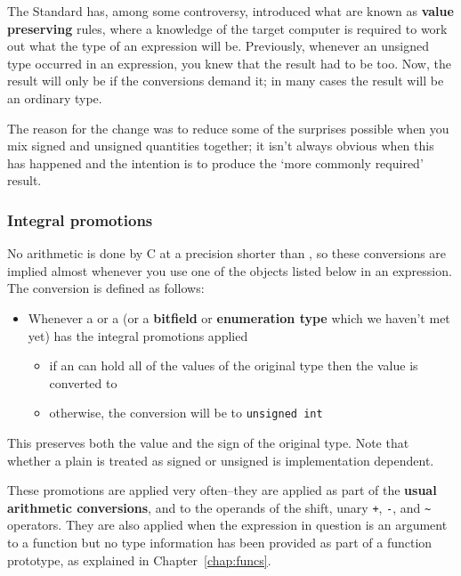   The Standard has, among some controversy, introduced what are known as
    \textbf{value preserving} rules, where a knowledge of the target
    computer is required to work out what the type of an expression will be.
    Previously, whenever an unsigned type occurred in an expression, you knew
    that the result had to be \unsigned{} too. Now, the result will
    only be \unsigned{} if the conversions demand it; in many cases
    the result will be an ordinary \signed{} type.


   The reason for the change was to reduce some of the surprises possible
    when you mix signed and unsigned quantities together; it isn't always
    obvious when this has happened and the intention is to produce the
    `more commonly required' result.


   \subsubsection{Integral promotions}
    

    No arithmetic is done by C at a precision shorter than
     \kint, so these conversions are implied almost whenever you
     use one of the objects listed below in an expression. The conversion is
     defined as follows:


    \begin{itemize}
     \item Whenever a \short{} or a \kchar{} (or a
      \textbf{bitfield} or \textbf{enumeration type} which we haven't met
      yet) has the integral promotions applied
      \begin{itemize}
       \item if an \kint{} can hold all of the values of the original
        type then the value is converted to \kint{}
       \item otherwise, the conversion will be to \texttt{unsigned int}
      \end{itemize}
     
    \end{itemize}

    This preserves both the value and the sign of the original type. Note
     that whether a plain \kchar{} is treated as signed or unsigned
     is implementation dependent.


    These promotions are applied very often--they are applied as part
     of the \textbf{usual arithmetic conversions}, and to the operands of
     the shift, unary \texttt{+}, \texttt{-}, and \texttt{\~}
     operators. They are also applied when the expression in question is an
     argument to a function but no type information has been provided as part
     of a function prototype, as explained in Chapter~\ref{chap:funcs}.


